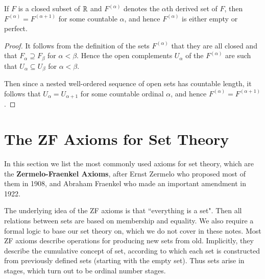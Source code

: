 \documentclass[12pt, a4paper, oneside, openright, titlepage]{book}
\begin{document}
\begin{thm}
    If $F$ is a closed subset of $\mathbb R$ and $F^{(\alpha)}$ denotes the $\alpha$th derived set of $F$, then $F^{(\alpha)} = F^{(\alpha+1)}$ for some countable $\alpha$, and hence $F^{(\alpha)}$ is either empty or perfect.
\end{thm}
\begin{proof}
    It follows from the definition of the sets $F^{(\alpha)}$ that they are all closed and that $F_{\alpha} \supseteq F_{\beta}$ for $\alpha < \beta$. Hence the open complements $U_{\alpha}$ of the $F^{(\alpha)}$ are such that $U_{\alpha} \subseteq U_{\beta}$ for $\alpha < \beta$.

    Then since a nested well-ordered sequence of open sets has countable length, it follows that $U_{\alpha} = U_{\alpha+1}$ for some countable ordinal $\alpha$, and hence $F^{(\alpha)} = F^{(\alpha+1)}$.
\end{proof}



\section{The ZF Axioms for Set Theory}

In this section we list the most commonly used axioms for set theory, which are the \textbf{Zermelo-Fraenkel Axioms}, after Ernst Zermelo who proposed most of them in 1908, and Abraham Fraenkel who made an important amendment in 1922.

The underlying idea of the ZF axioms is that ``everything is a set". Then all relations between sets are based on membership and equality. We also require a formal logic to base our set theory on, which we do not cover in these notes. Most ZF axioms describe operations for producing new sets from old. Implicitly, they describe the cumulative concept of set, according to which each set is constructed from previously defined sets (starting with the empty set). Thus sets arise in stages, which turn out to be ordinal number stages.
\end{document}
